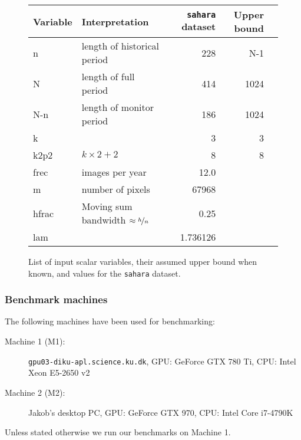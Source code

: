 \begin{figure}[H]
    \centering
    \begin{tabular}{l l r r r}
    \textbf{Variable} & \textbf{Interpretation}             & \textbf{\texttt{sahara} dataset} & \textbf{Upper bound} \\ \hline
        n                & length of historical period  & 228                     & N-1 \\
        N                & length of full period        & 414                     & 1024   \\
        N-n              & length of monitor period     & 186                     & 1024 \\
        k                &                              & 3                       & 3 \\
        k2p2             & \(k\times2 + 2\)             & 8                       & 8 \\
        frec             & images per year              & 12.0                    & \\
        m                & number of pixels             & 67968                   & \\
        hfrac            & Moving sum bandwidth \(\approx \nicefrac{h}{n}\)    & 0.25                    & \\
        lam              &                              & 1.736126                &
    \end{tabular}
    \caption{List of input scalar variables, their assumed upper bound when known, and values for the \texttt{sahara} dataset.}
    \label{tbl:scalars}
\end{figure}



\subsubsection{Benchmark machines}\label{sec:machines}

The following machines have been used for benchmarking:
%
\begin{description}
  \item[Machine 1 (M1): ]
    \texttt{gpu03-diku-apl.science.ku.dk}, GPU: GeForce GTX 780 Ti, CPU: Intel Xeon E5-2650 v2
  \item[Machine 2 (M2): ]
    Jakob's desktop PC, GPU: GeForce GTX 970, CPU: Intel Core i7-4790K
\end{description}

Unless stated otherwise we run our benchmarks on Machine 1.

